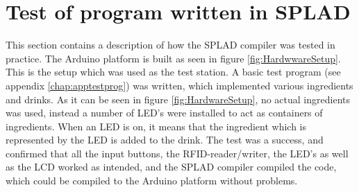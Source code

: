 \section{Test of program written in SPLAD}
This section contains a description of how the SPLAD compiler was tested in practice. The Arduino platform is built as seen in figure \ref{fig:HardwwareSetup}. This is the setup which was used as the test station. A basic test program (see appendix \ref{chap:apptestprog}) was written, which implemented various ingredients and drinks. As it can be seen in figure \ref{fig:HardwareSetup}, no actual ingredients was used, instead a number of LED's were installed to act as containers of ingredients. When an LED is on, it means that the ingredient which is represented by the LED is added to the drink. The test was a success, and confirmed that all the input buttons, the RFID-reader/writer, the LED's as well as the LCD worked as intended, and the SPLAD compiler compiled the code, which could be compiled to the Arduino platform without problems.